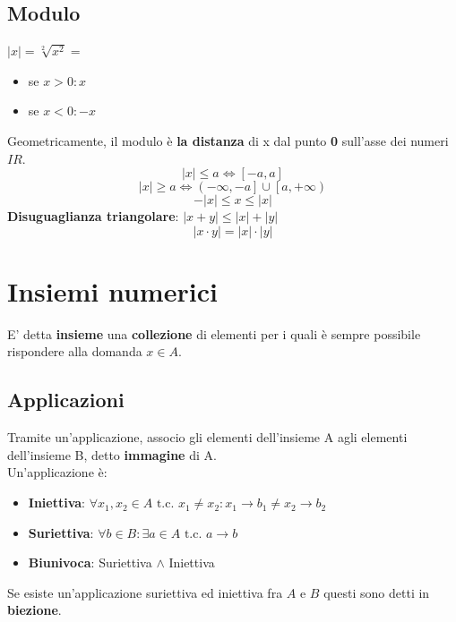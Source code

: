 \documentclass{report}
\begin{document}
    \subsection{Modulo}
        $ |x| = \sqrt[2]{x^2} = $
        \begin{itemize}
            \item se $x > 0: x $
            \item se $x < 0: -x $
        \end{itemize}
        Geometricamente, il modulo è \textbf{la distanza} di x dal punto \textbf{0} sull'asse dei numeri $I\!R$. \\
        $$ |x| \leq a \Longleftrightarrow \left[ -a, a \right] $$
        $$ |x| \geq a \Longleftrightarrow \left( -\infty, -a \right] \cup \left[ a, +\infty \right) $$
        $$ -|x| \leq x \leq |x| $$ 
        \textbf{Disuguaglianza triangolare}: $|x + y| \leq |x| + |y|$
        $$ |x \cdot y| = |x| \cdot |y| $$
\section{Insiemi numerici}
    E' detta \textbf{insieme} una \textbf{collezione} di elementi per i quali è 
    sempre possibile rispondere alla domanda $x \in A$.
    \subsection{Applicazioni}
    Tramite un'applicazione, associo gli elementi dell'insieme A
    agli elementi dell'insieme B, detto \textbf{immagine} di A. \\
    Un'applicazione è:
    \begin{itemize}
        \item \textbf{Iniettiva}: $
            \forall x_1, x_2 \in A \textrm{ t.c. } x_1 \neq x_2:
            x_1 \rightarrow b_1 \neq x_2 \rightarrow b_2
        $
        \item \textbf{Suriettiva}: $\forall b \in B: 
            \exists a \in A \textrm{ t.c. } a \rightarrow b
        $
        \item \textbf{Biunivoca}: Suriettiva $\wedge$ Iniettiva
    \end{itemize}
    Se esiste un'applicazione suriettiva ed iniettiva fra $A$ e $B$ questi sono
    detti in \textbf{biezione}.
\end{document}
